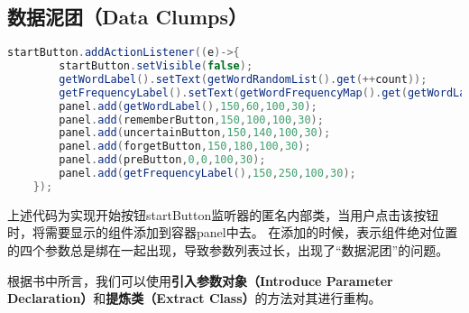 \documentclass[a4paper]{article}
\begin{document}
\subsection{数据泥团（Data Clumps）}
\begin{lstlisting}[language={java}]
    startButton.addActionListener((e)->{
        startButton.setVisible(false);
        getWordLabel().setText(getWordRandomList().get(++count));
        getFrequencyLabel().setText(getWordFrequencyMap().get(getWordLabel().getText()).toString());
        panel.add(getWordLabel(),150,60,100,30);
        panel.add(rememberButton,150,100,100,30);
        panel.add(uncertainButton,150,140,100,30);
        panel.add(forgetButton,150,180,100,30);
        panel.add(preButton,0,0,100,30);
        panel.add(getFrequencyLabel(),150,250,100,30);
    });
\end{lstlisting}

上述代码为实现开始按钮startButton监听器的匿名内部类，当用户点击该按钮时，将需要显示的组件添加到容器panel中去。
在添加的时候，表示组件绝对位置的四个参数总是绑在一起出现，导致参数列表过长，出现了“数据泥团”的问题。

根据书中所言，我们可以使用\textbf{引入参数对象（Introduce Parameter Declaration）}和\textbf{提炼类（Extract Class）}的方法对其进行重构。
\end{document}
